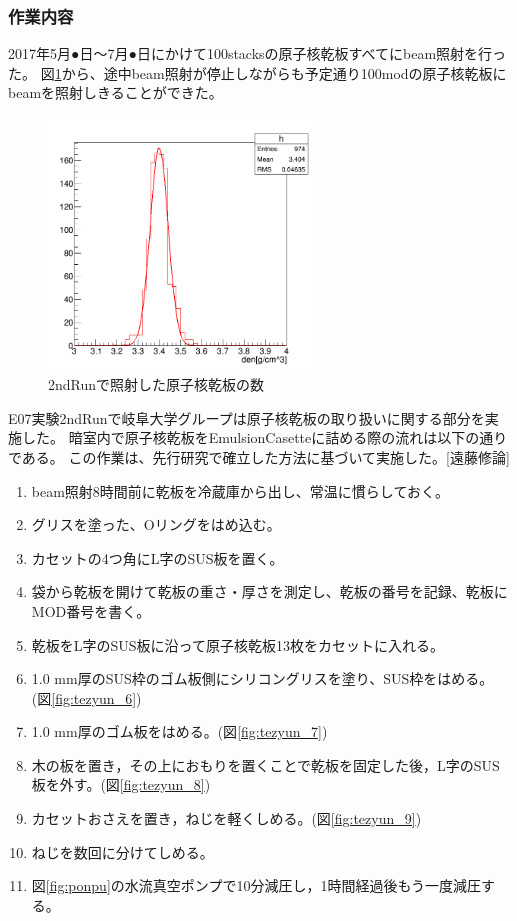 \documentclass[12pt,a4paper]{jarticle}
\begin{document}
\subsubsection{作業内容}
2017年5月●日～7月●日にかけて100stacksの原子核乾板すべてにbeam照射を行った。
図\ref{fig:beam_day}から、途中beam照射が停止しながらも予定通り100modの原子核乾板にbeamを照射しきることができた。
\begin{figure}[htbp]
  \centering
     \includegraphics[width=70mm]{thick75_den.png}
  \caption{2ndRunで照射した原子核乾板の数\label{fig:beam_day}}
\end{figure}
E07実験2ndRunで岐阜大学グループは原子核乾板の取り扱いに関する部分を実施した。
暗室内で原子核乾板をEmulsionCasetteに詰める際の流れは以下の通りである。
この作業は、先行研究で確立した方法に基づいて実施した。[遠藤修論]
\begin{enumerate}
    \item beam照射8時間前に乾板を冷蔵庫から出し、常温に慣らしておく。
    \item グリスを塗った、Oリングをはめ込む。
    \item カセットの4つ角にL字のSUS板を置く。 
    \item 袋から乾板を開けて乾板の重さ・厚さを測定し、乾板の番号を記録、乾板にMOD番号を書く。
    \item 乾板をL字のSUS板に沿って原子核乾板13枚をカセットに入れる。
    \item 1.0 mm厚のSUS枠のゴム板側にシリコングリスを塗り、SUS枠をはめる。(図\ref{fig:tezyun_6})
    \item 1.0 mm厚のゴム板をはめる。(図\ref{fig:tezyun_7})
    \item 木の板を置き，その上におもりを置くことで乾板を固定した後，L字のSUS板を外す。(図\ref{fig:tezyun_8})
    \item カセットおさえを置き，ねじを軽くしめる。(図\ref{fig:tezyun_9})
    \item ねじを数回に分けてしめる。
    \item 図\ref{fig:ponpu}の水流真空ポンプで10分減圧し，1時間経過後もう一度減圧する。
\end{enumerate}
\end{document}
